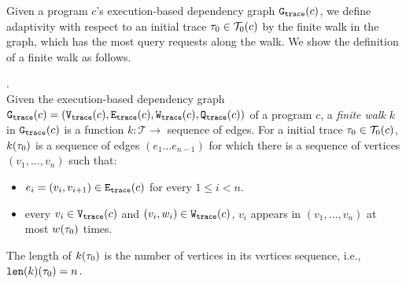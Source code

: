 Given 
a program $c$'s execution-based dependency graph 
$\mathtt{{G_{trace}}}({c})$,
we define adaptivity 
with respect to an initial trace $\mathtt{\tau}_0 \in \mathcal{T}_0(c)$ by the finite walk in the graph, which has the most query requests along the walk.
We show the definition of a finite walk as follows.
%

\begin{defn}.
  \label{def:finitewalk}
  \\
  Given the execution-based dependency graph $\mathtt{{G_{trace}}}({c}) = (\mathtt{{V_{trace}}}({c}), \mathtt{{E_{trace}}}({c}), \mathtt{{W_{trace}}}({c}), \mathtt{{Q_{trace}}}({c}))$ of a program $c$,
  a \emph{finite walk} $k$ in $\mathtt{{G_{trace}}}({c})$ is a 
  function $k: \mathcal{T} \to $ sequence of edges.
  For a initial trace $\mathtt{\tau}_0 \in \mathcal{T}_0(c)$, 
  $k(\mathtt{\tau}_0)$ is a sequence of edges $(e_1 \ldots e_{n - 1})$ 
  for which there is a sequence of vertices 
  $(v_1, \ldots, v_{n})$ such that:
  \begin{itemize}
      \item $e_i = (v_{i},v_{i + 1}) \in \mathtt{{E_{trace}}}(c)$ for every $1 \leq i < n$.
      \item every $v_i \in \mathtt{{V_{trace}}}(c)$
      and $(v_i, w_i) \in \mathtt{{W_{trace}}}(c)$, 
       $v_i$ appears in $(v_1, \ldots, v_{n})$ at most 
    $w(\mathtt{\tau}_0)$
      times.  
  \end{itemize}
  The length of $k(\mathtt{\tau}_0)$ is the number of vertices in its vertices sequence, i.e., $\mathtt{len}(k)(\mathtt{\tau}_0) = n$.
 \end{defn}

